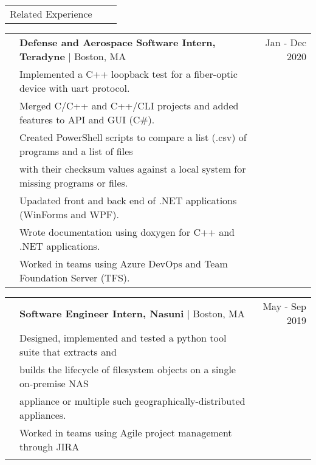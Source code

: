 \documentclass[letterpaper,10pt,oneside]{article}
\begin{document}
\noindent \begin{tabularx}{\linewidth}{@{} l l R }
     \Large{Related Experience}\\
\end{tabularx}

\noindent \begin{tabularx}{\linewidth}{@{} l l R }
     & \textbf{Defense and Aerospace Software Intern, Teradyne} $\mid$ Boston, MA & Jan - Dec 2020 \\
     & Implemented a C++ loopback test for a fiber-optic device with uart protocol.\\
     & Merged C/C++ and C++/CLI projects and added features to API and GUI (C\#).\\
     & Created PowerShell scripts to compare a list (.csv) of programs and a list of files\\
     & \indent with their checksum values against a local system for missing programs or files.\\
     & Upadated front and back end of .NET applications (WinForms and WPF).\\
     & Wrote documentation using doxygen for C++ and .NET applications.\\
     & Worked in teams using Azure DevOps and Team Foundation Server (TFS).\\
\end {tabularx}

\noindent \begin{tabularx}{\linewidth}{@{} l l R }
     & \textbf{Software Engineer Intern, Nasuni} $\mid$ Boston, MA & May - Sep 2019 \\
     & Designed, implemented and tested a python tool suite that extracts and\\
     & \indent builds the lifecycle of filesystem objects on a single on-premise NAS\\
     & \indent appliance or multiple such geographically-distributed appliances.\\
     & Worked in teams using Agile project management through JIRA\\
     \\
\end{tabularx}
\end{document}
